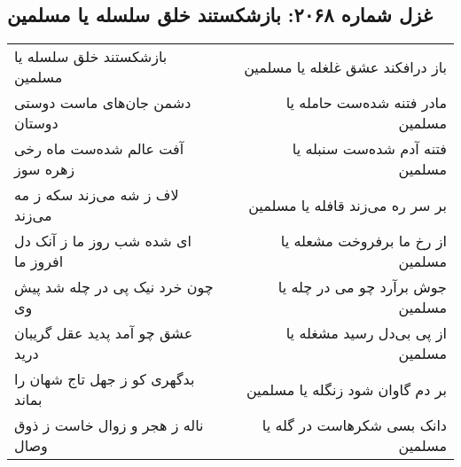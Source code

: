 \begin{center}
\section*{غزل شماره ۲۰۶۸: بازشکستند خلق سلسله یا مسلمین}
\label{sec:2068}
\begin{longtable}{l p{0.5cm} r}
بازشکستند خلق سلسله یا مسلمین
&&
باز درافکند عشق غلغله یا مسلمین
\\
دشمن جان‌های ماست دوستی دوستان
&&
مادر فتنه شده‌ست حامله یا مسلمین
\\
آفت عالم شده‌ست ماه رخی زهره سوز
&&
فتنه آدم شده‌ست سنبله یا مسلمین
\\
لاف ز شه می‌زند سکه ز مه می‌زند
&&
بر سر ره می‌زند قافله یا مسلمین
\\
ای شده شب روز ما ز آنک دل افروز ما
&&
از رخ ما برفروخت مشعله یا مسلمین
\\
چون خرد نیک پی در چله شد پیش وی
&&
جوش برآرد چو می در چله یا مسلمین
\\
عشق چو آمد پدید عقل گریبان درید
&&
از پی بی‌دل رسید مشغله یا مسلمین
\\
بدگهری کو ز جهل تاج شهان را بماند
&&
بر دم گاوان شود زنگله یا مسلمین
\\
ناله ز هجر و زوال خاست ز ذوق وصال
&&
دانک بسی شکرهاست در گله یا مسلمین
\\
\end{longtable}
\end{center}
